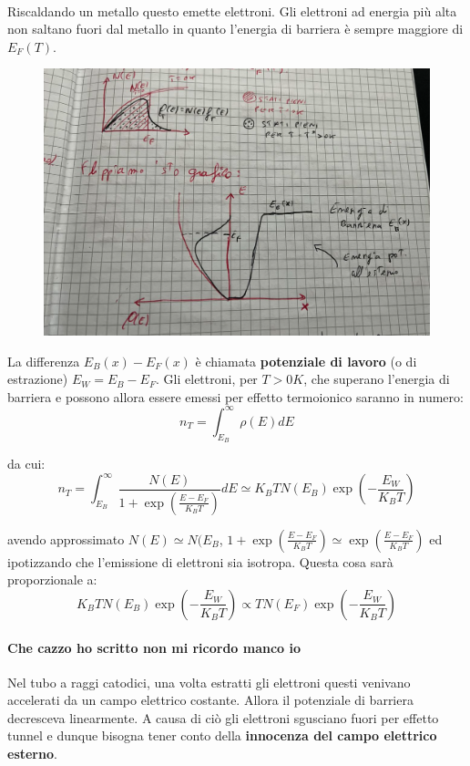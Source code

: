 \documentclass{book}
\begin{document}
        \paragraph{}
            Riscaldando un metallo questo emette elettroni. Gli elettroni ad energia più alta non saltano fuori dal metallo in quanto l'energia di barriera è sempre maggiore di $E_{F}(T)$.
            \begin{figure}[h!]
                \centering
                \includegraphics[width=0.85\linewidth]{img/EffettoTermoionicoBarrieraLez12.png}
            \end{figure}
            La differenza $E_{B}(x)-E_{F}(x)$ è chiamata \textbf{potenziale di lavoro} (o di estrazione) $E_{W} = E_{B} - E_{F}$.
            Gli elettroni, per $T>0K$, che superano l'energia di barriera e possono allora essere emessi per effetto termoionico saranno in numero:
            $$n_{T}  =\int_{E_{B}} ^{\infty} \rho(E)dE$$

            da cui:
            $$n_{T} = \int_{E_{B}} ^{\infty} \frac{N(E)}{1 + \exp{(\frac{E-E_{F}}{K_{B}T})}}dE \simeq K_{B}TN(E_{B})\exp{(-\frac{E_{W}}{K_{B}T})}$$

            avendo approssimato $N(E) \simeq N(E_{B}$, $1 + \exp{(\frac{E-E_{F}}{K_{B}T})} \simeq \exp{(\frac{E-E_{F}}{K_{B}T})}$ ed ipotizzando che l'emissione di elettroni sia isotropa. Questa cosa sarà proporzionale a:
            $$K_{B}TN(E_{B})\exp{(-\frac{E_{W}}{K_{B}T})} \propto TN(E_{F})\exp{(-\frac{E_{W}}{K_{B}T})}$$

            \paragraph{Che cazzo ho scritto non mi ricordo manco io}
                Nel tubo a raggi catodici, una volta estratti gli elettroni questi venivano accelerati da un campo elettrico costante. Allora il potenziale di barriera decresceva linearmente. A causa di ciò gli elettroni sgusciano fuori per effetto tunnel e dunque bisogna tener conto della \textbf{innocenza del campo elettrico esterno}.
\end{document}
